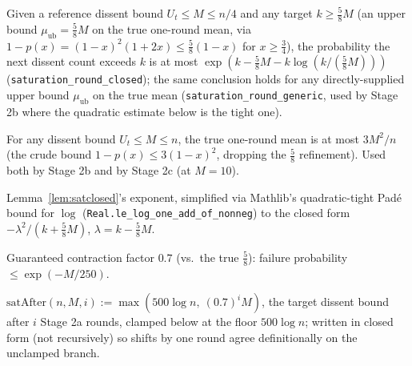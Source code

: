\begin{lemma}\label{lem:satclosed}
  \leanok
  Given a reference dissent bound $U_t\le M\le n/4$ and any target
  $k\ge\tfrac58M$ (an upper bound $\mu_{\mathrm{ub}}=\tfrac58M$ on the true
  one-round mean, via $1-p(x)=(1-x)^2(1+2x)\le\tfrac58(1-x)$ for
  $x\ge\tfrac34$), the probability the next dissent count exceeds $k$ is at
  most $\exp(k-\tfrac58M-k\log(k/(\tfrac58M)))$
  (\texttt{saturation\_round\_closed}); the same conclusion holds for any
  directly-supplied upper bound $\mu_{\mathrm{ub}}$ on the true mean
  (\texttt{saturation\_round\_generic}, used by Stage 2b where the
  quadratic estimate below is the tight one).
\end{lemma}

\begin{lemma}\label{lem:satquad}
  \leanok
  For any dissent bound $U_t\le M\le n$, the true one-round mean is at most
  $3M^2/n$ (the crude bound $1-p(x)\le3(1-x)^2$, dropping the $\tfrac58$
  refinement). Used both by Stage 2b and by Stage 2c (at $M=10$).
\end{lemma}

\begin{lemma}\label{lem:satnumeric}
  \leanok
  Lemma~\ref{lem:satclosed}'s exponent, simplified via Mathlib's
  quadratic-tight Pad\'e bound for $\log$
  (\texttt{Real.le\_log\_one\_add\_of\_nonneg}) to the closed form
  $-\lambda^2/(k+\tfrac58M)$, $\lambda=k-\tfrac58M$.
\end{lemma}

\begin{lemma}\label{lem:satcontract}
  \leanok
  Guaranteed contraction factor $0.7$ (vs.\ the true $\tfrac58$): failure
  probability $\le\exp(-M/250)$.
\end{lemma}

\begin{definition}\label{def:satafter}
  \leanok
  $\mathrm{satAfter}(n,M,i) := \max(500\log n,\ (0.7)^i M)$, the target
  dissent bound after $i$ Stage 2a rounds, clamped below at the floor
  $500\log n$; written in closed form (not recursively) so shifts by one
  round agree definitionally on the unclamped branch.
\end{definition}

